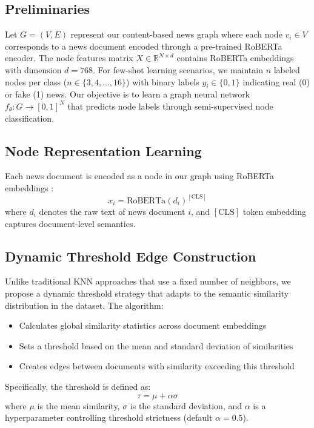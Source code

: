 \documentclass[conference]{IEEEtran}
\begin{document}
\subsection{Preliminaries}
Let \( G = (V, E) \) represent our content-based news graph where each node \( v_i \in V \) corresponds to a news document encoded through a pre-trained RoBERTa encoder. The node features matrix \( X \in \mathbb{R}^{N \times d} \) contains RoBERTa embeddings with dimension \( d=768 \). For few-shot learning scenarios, we maintain \( n \) labeled nodes per class (\( n \in \{3,4,...,16\} \)) with binary labels \( y_i \in \{0,1\} \) indicating real (0) or fake (1) news. Our objective is to learn a graph neural network \( f_\theta: G \rightarrow [0,1]^N \) that predicts node labels through semi-supervised node classification.

\subsection{Node Representation Learning}
Each news document is encoded as a node in our graph using RoBERTa embeddings \cite{liu2019roberta}:
\begin{equation}
x_i = \text{RoBERTa}(d_i)^{[\text{CLS}]}
\end{equation}
where \( d_i \) denotes the raw text of news document \( i \), and \( [\text{CLS}] \) token embedding captures document-level semantics.

\subsection{Dynamic Threshold Edge Construction}
Unlike traditional KNN approaches that use a fixed number of neighbors, we propose a dynamic threshold strategy that adapts to the semantic similarity distribution in the dataset. The algorithm:

\begin{itemize}
    \item Calculates global similarity statistics across document embeddings
    \item Sets a threshold based on the mean and standard deviation of similarities
    \item Creates edges between documents with similarity exceeding this threshold
\end{itemize}

Specifically, the threshold is defined as:
\begin{equation}
    \tau = \mu + \alpha\sigma
\end{equation}
where $\mu$ is the mean similarity, $\sigma$ is the standard deviation, and $\alpha$ is a hyperparameter controlling threshold strictness (default $\alpha=0.5$).
\end{document}
